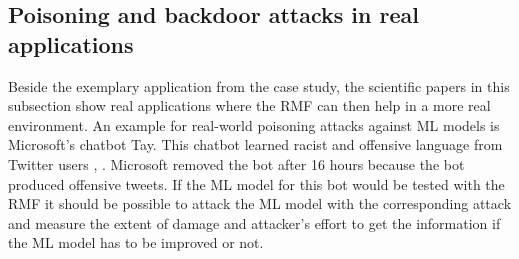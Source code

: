 \subsection{Poisoning and backdoor attacks in real applications}

Beside the exemplary application from the case study, the scientific papers in this subsection show real applications where the RMF can then help in a more real environment. An example for real-world poisoning attacks against ML models is Microsoft's chatbot Tay. This chatbot learned racist and offensive language from Twitter users \cite{DBLP:conf/iciot/BaracaldoCLSZ18}, \cite{DBLP:conf/ccs/BaracaldoCLS17}. Microsoft removed the bot after 16 hours because the bot produced offensive tweets. If the ML model for this bot would be tested with the RMF it should be possible to attack the ML model with the corresponding attack and measure the extent of damage and attacker's effort to get the information if the ML model has to be improved or not.
